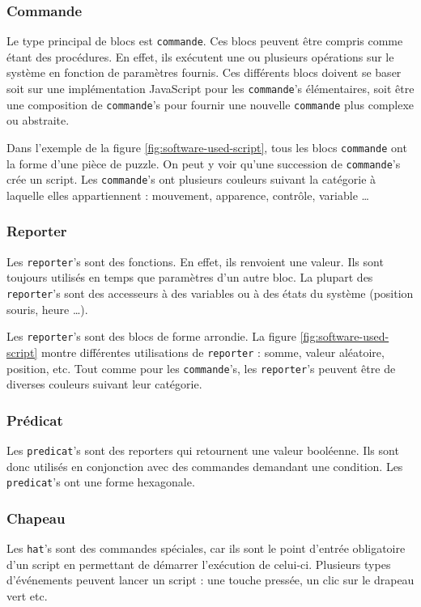\subsubsection{Commande}
Le type principal de \glspl{bloc} est \texttt{commande}. Ces \glspl{bloc} peuvent être compris comme étant des procédures. En effet, ils exécutent une ou plusieurs opérations sur le système en fonction de paramètres fournis. Ces différents \glspl{bloc} doivent se baser soit sur une implémentation JavaScript pour les \texttt{commande}'s élémentaires, soit être une composition de \texttt{commande}'s pour fournir une nouvelle \texttt{commande} plus complexe ou abstraite.

Dans l'exemple de la figure \ref{fig:software-used-script}, tous les \glspl{bloc} \texttt{commande} ont la forme d'une pièce de puzzle. On peut y voir qu'une succession de \texttt{commande}'s crée un \gls{script}. Les \texttt{commande}'s ont plusieurs couleurs suivant la catégorie à laquelle elles appartiennent : mouvement, apparence, contrôle, variable \ldots

\subsubsection{Reporter}
Les \texttt{reporter}'s sont des fonctions. En effet, ils renvoient une valeur. Ils sont toujours utilisés en temps que paramètres d'un autre \gls{bloc}. La plupart des \texttt{reporter}'s sont des accesseurs à des variables ou à des états du système (position souris, heure \ldots).

Les \texttt{reporter}'s sont des \glspl{bloc} de forme arrondie. La figure \ref{fig:software-used-script} montre différentes utilisations de \texttt{reporter} : somme, valeur aléatoire, position, etc. Tout comme pour les \texttt{commande}'s, les \texttt{reporter}'s peuvent être de diverses couleurs suivant leur catégorie.

\subsubsection{Prédicat}
Les \texttt{predicat}'s sont des reporters qui retournent une valeur booléenne. Ils sont donc utilisés en conjonction avec des commandes demandant une condition. Les \texttt{predicat}'s ont une forme hexagonale.

\subsubsection{Chapeau}
Les \texttt{hat}'s sont des commandes spéciales, car ils sont le point d'entrée obligatoire d'un \gls{script} en permettant de démarrer l'exécution de celui-ci. Plusieurs types d'événements peuvent lancer un \gls{script} : une touche pressée, un clic sur le drapeau vert etc.

